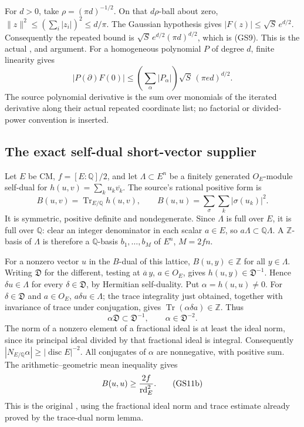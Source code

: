 For \(d>0\), take \(\rho=(\pi d)^{-1/2}\).
On that \(d\rho\)-ball about zero,
\(\|z\|^2\le(\sum_i|z_i|)^2\le d/\pi\).
The Gaussian hypothesis gives \(|F(z)|\le\sqrt S\,e^{d/2}\).
Consequently the repeated bound is
\(\sqrt S\,e^{d/2}(\pi d)^{d/2}\), which is (GS9).
This is the actual ,
 and  argument.
For a homogeneous polynomial \(P\) of degree \(d\), finite
linearity gives
\[
 |P(\partial)F(0)|
     \le \left(\sum_\alpha|P_\alpha|\right)
                           \sqrt S\,(\pi e d)^{d/2}.
 \tag{GS10}\label{eq:sr-source-polynomial-Cauchy}
\]
The source polynomial derivative is the sum over monomials of
the iterated derivative along their actual repeated coordinate
list; no factorial or divided-power convention is inserted.

\subsection{The exact self-dual short-vector supplier}
Let \(E\) be CM, \(f=[E:\mathbb Q]/2\), and let
\(\Lambda\subset E^n\) be a finitely generated \(O_E\)-module
self-dual for \(h(u,v)=\sum_k u_k\overline{v_k}\).
The source's rational positive form is
\[
 B(u,v)=\operatorname{Tr}_{E/\mathbb Q}h(u,v),\qquad
 B(u,u)=\sum_\sigma\sum_k|\sigma(u_k)|^2 .
 \tag{GS11a}\label{eq:sr-source-trace-hermitian}
\]
It is symmetric, positive definite and nondegenerate.
Since \(\Lambda\) is full over \(E\), it is full over \(\mathbb Q\):
clear an integer denominator in each scalar \(a\in E\), so
\(a\Lambda\subset\mathbb Q\Lambda\).
A \(\mathbb Z\)-basis of \(\Lambda\) is therefore a
\(\mathbb Q\)-basis \(b_1,\ldots,b_M\) of \(E^n\), \(M=2fn\).

For a nonzero vector \(u\) in the \(B\)-dual of this lattice,
\(B(u,y)\in\mathbb Z\) for all \(y\in\Lambda\).
Writing \(\mathfrak D\) for the different, testing at
\(\overline a\,y\), \(a\in O_E\), gives
\(h(u,y)\in\mathfrak D^{-1}\).
Hence \(\delta u\in\Lambda\) for every
\(\delta\in\mathfrak D\), by Hermitian self-duality.
Put \(\alpha=h(u,u)\ne0\).
For \(\delta\in\mathfrak D\) and \(a\in O_E\),
\(a\delta u\in\Lambda\); the trace integrality just obtained,
together with invariance of trace under conjugation, gives
\(\operatorname{Tr}(\alpha\delta a)\in\mathbb Z\).
Thus
\[
                  \alpha\mathfrak D\subset\mathfrak D^{-1},
                    \qquad \alpha\in\mathfrak D^{-2}.
\]
The norm of a nonzero element of a fractional ideal is at least
the ideal norm, since its principal ideal divided by that
fractional ideal is integral. Consequently
\(|N_{E/\mathbb Q}\alpha|\ge|\operatorname{disc}E|^{-2}\).
All conjugates of \(\alpha\) are nonnegative, with positive sum.
The arithmetic--geometric mean inequality gives
\[
                   B(u,u)\ge {2f\over\mathrm{rd}_E^2}.
 \tag{GS11b}\label{eq:sr-source-trace-dual-min}
\]
This is the original
, using the fractional
ideal norm and trace estimate already proved by the trace-dual
norm lemma.

